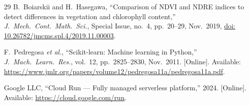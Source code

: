 \documentclass[conference]{IEEEtran}
\begin{document}
\begin{thebibliography}{29}
B.~Boiarskii and H.~Hasegawa,
``Comparison of NDVI and NDRE indices to detect differences in vegetation
and chlorophyll content,''
\textit{J.\ Mech.\ Cont.\ Math.\ Sci.}, Special Issue, no.~4,
pp.~20--29, Nov.\ 2019,
\href{https://doi.org/10.26782/jmcms.spl.4/2019.11.00003}{doi: 10.26782/jmcms.spl.4/2019.11.00003}.

F.~Pedregosa \textit{et al.},
``Scikit-learn: Machine learning in Python,''
\textit{J.\ Mach.\ Learn.\ Res.}, vol.~12, pp.~2825--2830, Nov.\ 2011. [Online]. Available: \url{https://www.jmlr.org/papers/volume12/pedregosa11a/pedregosa11a.pdf}.

Google LLC,
``Cloud Run — Fully managed serverless platform,'' 2024. [Online].
Available: \url{https://cloud.google.com/run}.

\end{thebibliography}
\end{document}
